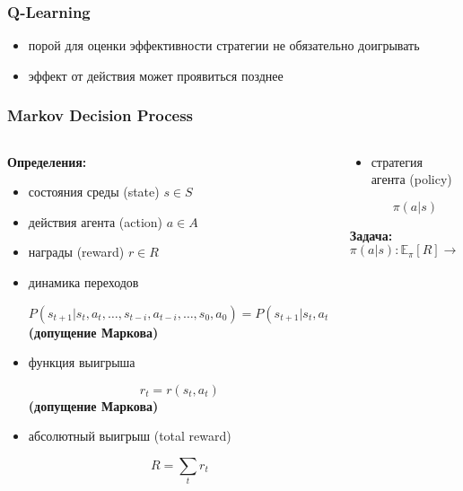 \documentclass[fullscreen=true, bookmarks=true, hyperref={pdfencoding=unicode}]{beamer}
\begin{document}
\begin{frame}
  \frametitle{Q-Learning}

  \begin{itemize}
    \item порой для оценки эффективности стратегии не обязательно доигрывать
    \item эффект от действия может проявиться позднее
  \end{itemize}
\end{frame}


\begin{frame}
  \frametitle{Markov Decision Process}

  \begin{columns}
    \begin{column}{.6\paperwidth}
      {\bf Определения:}
      \begin{itemize}
        \item состояния среды (state) $s \in S$
        \item действия агента (action) $a \in A$
        \item награды (reward) $r \in R$
        \item динамика переходов

         $ P(s_{t+1} | s_t, a_t, \dots, s_{t-i}, a_{t-i}, \dots, s_0, a_0) = P(s_{t+1} | s_t, a_t)$
         {\bf (допущение Маркова)}

        \item функция выигрыша

         $$ r_{t} = r(s_t, a_t)$$ {\bf (допущение Маркова)}
        \item абсолютный выигрыш (total reward)

         $$ R = \sum\limits_t r_t $$
      \end{itemize}
    \end{column}
    \begin{column}{.3\paperwidth}

      \begin{itemize}
        \item стратегия агента (policy)

        $$ \pi (a | s) $$
      \end{itemize}
      {\bf Задача:}
      $$ \pi (a | s): \mathbb{E}_\pi [R] \to \max $$
    \end{column}
  \end{columns}

\end{frame}
\end{document}
